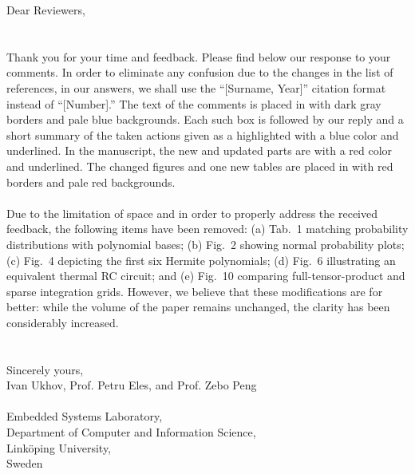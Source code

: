 Dear Reviewers,
\\
\\
\\
\noindent Thank you for your time and feedback.
Please find below our response to your comments.
In order to eliminate any confusion due to the changes in the list of references, in our answers, we shall use the ``[Surname, Year]'' citation format instead of ``[Number].''
The text of the comments is placed in  with dark gray borders and pale blue backgrounds.
Each such box is followed by our reply and a short summary of the taken actions given as a  highlighted with a blue color and underlined.
In the manuscript, the new and updated parts are  with a red color and underlined.
The changed figures and one new tables are placed in  with red borders and pale red backgrounds.
\\
\\
Due to the limitation of space and in order to properly address the received feedback, the following items have been removed:
(a) Tab.~1 matching probability distributions with polynomial bases;
(b) Fig.~2 showing normal probability plots;
(c) Fig.~4 depicting the first six Hermite polynomials;
(d) Fig.~6 illustrating an equivalent thermal RC circuit; and
(e) Fig.~10 comparing full-tensor-product and sparse integration grids.
However, we believe that these modifications are for better: while the volume of the paper remains unchanged, the clarity has been considerably increased.
\\
\\
\\
\noindent Sincerely yours,\\
Ivan Ukhov, Prof. Petru Eles, and Prof. Zebo Peng
\\
\\
\noindent Embedded Systems Laboratory,\\
Department of Computer and Information Science,\\
Link\"{o}ping University,\\
Sweden
